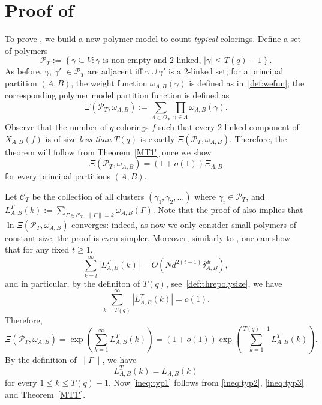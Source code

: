 \documentclass{amsart}
\theoremstyle{definition}
\newcommand{\bO}{O}
\newcommand{\we}{\omega}
\newcommand{\thre}{T}
\newcommand{\cP}{\mathcal{P} }
\newcommand{\0}[0]{\emptyset}
\begin{document}
\section{Proof of }\label{sec.realMT2}
To prove , we build a new polymer model to count \textit{typical} colorings.
Define a set of polymers
\begin{equation*}
\cP_T:=\left\{\gamma\subseteq V: \gamma \text{ is non-empty and 2-linked, } |\gamma|\leq T(q)-1\right\}.
\end{equation*}
As before, $\gamma$, $\gamma'$ $\in \cP_T$ are adjacent iff $\gamma\cup \gamma'$ is a $2$-linked set; for a principal partition $(A, B)$, the weight function $\we_{A,B}(\gamma)$ is defined as in~\eqref{def:wefun}; the corresponding polymer model partition function is defined as
\[
\Xi(\cP_T, \we_{A, B}):=\sum_{\Lambda\in\Omega_{\cP}}\prod_{\gamma\in\Lambda}\we_{A, B}(\gamma).
\]
Observe that the number of $q$-colorings $f$ such that every $2$-linked component of $X_{A,B}(f)$ is of size \textit{less than} $\thre(q)$ is exactly $\Xi(\cP_T, \we_{A, B})$. Therefore, the theorem will follow from Theorem~\ref{MT1'} once we show
\begin{equation}\label{ineq:typ1}
\Xi(\cP_T, \we_{A, B}) = (1 +o(1))\Xi_{A, B}
\end{equation}
for every principal partitions $(A, B)$.

Let $\mathcal{C}_T$ be the collection of all clusters $(\gamma_1, \gamma_2, \ldots)$ where $\gamma_i\in \cP_T$, and
$L^T_{A, B}(k):=\sum_{\Gamma\in \mathcal{C}_T,\  \lVert \Gamma\rVert=k}\we_{A,B}(\Gamma)$. 
Note that the proof of  also implies that $\ln\Xi(\cP_T, \we_{A, B})$ converges: indeed, as now we only consider small polymers of constant size, the proof is even simpler. 
Moreover, similarly to , one can show that for any fixed $t\geq 1$,
\[
\sum_{k=t}^{\infty}|L^T_{A, B}(k)|=\bO\left(Nd^{2(t-1)}\delta_{A, B}^{dt}\right),
\]
and in particular, by the definiton of $T(q)$, see~\eqref{def:threpolysize}, we have
\[
\sum_{k=T(q)}^{\infty}|L^T_{A, B}(k)|=o(1).
\]
Therefore,
\begin{equation}\label{ineq:typ2}
\Xi(\cP_T, \we_{A, B})=\exp\left(\sum_{k=1}^{\infty}L^T_{A, B}(k)\right)=(1 + o(1))\exp\left(\sum_{k=1}^{T(q)-1}L^T_{A, B}(k)\right).
\end{equation}
By the definition of $\lVert \Gamma\rVert$, we have
\begin{equation}\label{ineq:typ3}
L^T_{A, B}(k) = L_{A, B}(k) 
\end{equation}
for every $1\leq k \leq T(q)-1$. Now \eqref{ineq:typ1} follows from \eqref{ineq:typ2}, \eqref{ineq:typ3} and Theorem~\ref{MT1'}.
\end{document}
